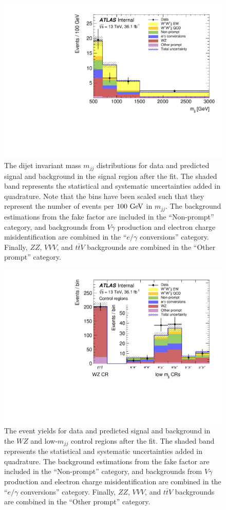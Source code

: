 \begin{figure}[htbp]
  \centering
  \includegraphics[width=.6\textwidth]{figs/ssww_13tev/results/mjj_postfit_all}
  \caption{The dijet invariant mass $m_{jj}$ distributions for data and predicted signal and background in the signal region after the fit.  The shaded band represents the statistical and systematic uncertainties added in quadrature.  Note that the bins have been scaled such that they represent the number of events per $100\gev$ in $m_{jj}$.  The background estimations from the fake factor are included in the ``Non-prompt'' category, and backgrounds from  $V\gamma$ production and electron charge misidentification are combined in the ``$e/\gamma$ conversions'' category.  Finally, $ZZ$, $VVV$, and $t\bar{t}V$ backgrounds are combined in the ``Other prompt'' category.}
  \label{fig:ssww13tev_results_mjj_sr_postfit}
\end{figure}

\begin{figure}[htbp]
  \centering
  \includegraphics[width=.6\textwidth]{figs/ssww_13tev/results/plotCR}
  \caption{The event yields for data and predicted signal and background in the $WZ$ and low-$m_{jj}$ control regions after the fit.  The shaded band represents the statistical and systematic uncertainties added in quadrature.  The background estimations from the fake factor are included in the ``Non-prompt'' category, and backgrounds from  $V\gamma$ production and electron charge misidentification are combined in the ``$e/\gamma$ conversions'' category.  Finally, $ZZ$, $VVV$, and $t\bar{t}V$ backgrounds are combined in the ``Other prompt'' category.}
  \label{fig:ssww13tev_results_cr_postfit}
\end{figure}

